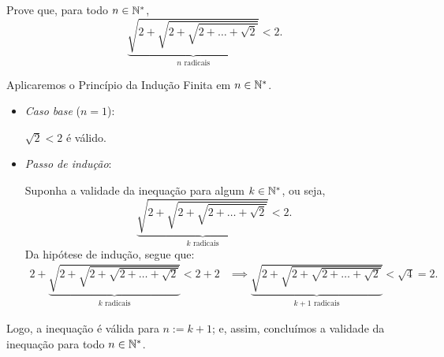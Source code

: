 \begin{example}
Prove  que, para todo $n \in \mathbb{N}^*$,
%
\begin{equation*}
\underbrace{\sqrt{2+\sqrt{2+\sqrt{2+ \dots + \sqrt 2}}}}_{n  \text{ radicais}} < 2.
\end{equation*}
\end{example}

\begin{solution}
Aplicaremos o Princípio da Indução Finita em $n \in \mathbb{N}^*$.
%
\begin{itemize}
	\item \textit{Caso base} ($n=1$):

	$\sqrt 2 < 2$ é válido.

	\item \textit{Passo de indução}:

	Suponha a validade da inequação para algum $k \in \mathbb{N}^*$, ou seja, 
	\begin{equation*}
	\underbrace{\sqrt{2+\sqrt{2+\sqrt{2+ \dots + \sqrt 2}}}}_{k  \text{ radicais}} < 2.
	\end{equation*}
	Da hipótese de indução, segue que:
	\begin{align*}
	2+\underbrace{\sqrt{2+\sqrt{2+\sqrt{2+ \dots + \sqrt 2}}}}_{k  \text{ radicais}} < 2+2 & \implies \underbrace{\sqrt{2+\sqrt{2+\sqrt{2+ \dots + \sqrt 2}}}}_{k+1  \text{ radicais}} < \sqrt 4 = 2.
	\end{align*}
\end{itemize}
%
Logo, a inequação é válida para $n := k+1$; e, assim, concluímos a validade da inequação para todo $n \in \mathbb{N}^*$.
\end{solution}